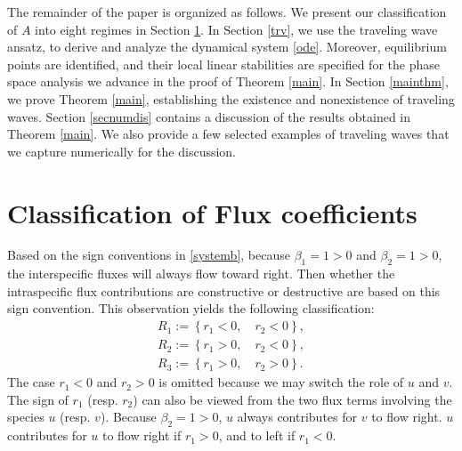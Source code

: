 \documentclass{amsart}
\theoremstyle{definition}
\numberwithin{equation}{section}
\begin{document}
The remainder of the paper is organized as follows. We present our classification of $A$ into eight regimes in Section \ref{notions}. In Section \ref{trv}, we use the traveling wave ansatz, to derive and analyze the dynamical system \eqref{ode}. Moreover, equilibrium points are identified, and their local linear stabilities are specified for the phase space analysis we advance in the proof of Theorem \ref{main}. In Section \ref{mainthm}, we prove Theorem \ref{main}, establishing the  existence and nonexistence of traveling waves. Section \ref{secnumdis} contains a discussion of the results obtained in Theorem \ref{main}. We also provide a few selected examples of traveling waves that we capture numerically for the discussion.



\section{Classification of Flux coefficients} \label{notions}




Based on the sign conventions in \eqref{systemb}, because $\beta_1=1>0$ and $\beta_2=1>0$, the interspecific fluxes will always flow toward right. Then whether the intraspecific flux contributions are constructive or destructive are based on this sign convention. This observation yields the following classification:
\begin{equation} \label{classifications}
\begin{aligned}
 R_1:= \left\{r_1<0, \quad r_2<0 \right\},\\ %
 R_2:= \left\{r_1>0, \quad r_2<0 \right\},\\ %
 R_3:= \left\{r_1>0, \quad r_2>0 \right\}.%
\end{aligned}
\end{equation}
The case $r_1<0$ and $r_2>0$ is omitted because we may switch the role of $u$ and $v$. The sign of $r_1$ (resp. $r_2$) can also be viewed from the two flux terms involving the species $u$ (resp. $v$). Because $\beta_2=1>0$, $u$ always contributes for $v$ to flow right. $u$ contributes for $u$ to flow right if $r_1>0$, and to left if $r_1<0$.
\end{document}
